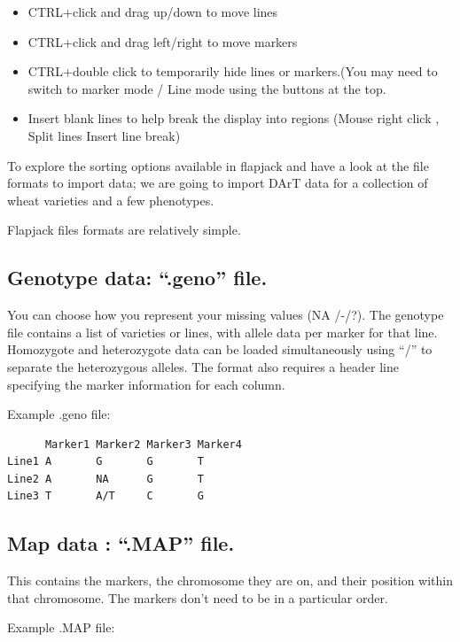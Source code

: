 \documentclass[
]{book}
\providecommand{\tightlist}{%
  \setlength{\itemsep}{0pt}\setlength{\parskip}{0pt}}
\begin{document}
\begin{itemize}
\tightlist
\item
  CTRL+click and drag up/down to move lines
\item
  CTRL+click and drag left/right to move markers
\item
  CTRL+double click to temporarily hide lines or markers.(You may need to switch to marker mode / Line mode using the buttons at the top.
\item
  Insert blank lines to help break the display into regions (Mouse right click , Split lines Insert line break)
\end{itemize}

To explore the sorting options available in flapjack and have a look at the file formats to import data; we are going to import DArT data for a collection of wheat varieties and a few
phenotypes.

Flapjack files formats are relatively simple.

\hypertarget{genotype-data-.geno-file.}{%
\subsection{Genotype data: ``.geno'' file.}\label{genotype-data-.geno-file.}}

You can choose how you represent your missing values (NA /-/?). The genotype file contains a list of varieties or lines, with allele data per marker for that line. Homozygote and heterozygote data can be loaded simultaneously using ``/'' to separate the heterozygous alleles. The format also requires a header line specifying the marker information for each column.

Example .geno file:

\begin{verbatim}
      Marker1 Marker2 Marker3 Marker4
Line1 A       G       G       T
Line2 A       NA      G       T
Line3 T       A/T     C       G
\end{verbatim}

\hypertarget{map-data-.map-file.}{%
\subsection{Map data : ``.MAP'' file.}\label{map-data-.map-file.}}

This contains the markers, the chromosome they are on, and their position within that chromosome. The markers don't need to be in a particular order.

Example .MAP file:
\end{document}

